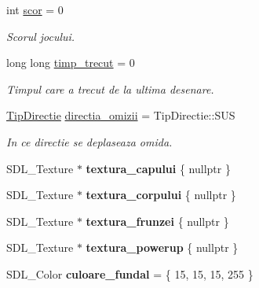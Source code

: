 \begin{DoxyCompactItemize}
int \hyperlink{classStadiulJocului_a1c96d2d1fdcc40bf7c111f549f14ccb5}{scor} = 0
\begin{DoxyCompactList}\small\item\em Scorul jocului. \end{DoxyCompactList}\item 
\mbox{\label{classStadiulJocului_a338b9e5467ad6d4d355c3978e04d32d6}} 
long long \hyperlink{classStadiulJocului_a338b9e5467ad6d4d355c3978e04d32d6}{timp\+\_\+trecut} = 0
\begin{DoxyCompactList}\small\item\em Timpul care a trecut de la ultima \textquotesingle{}desenare\textquotesingle{}. \end{DoxyCompactList}\item 
\hyperlink{main_8cpp_aea66a0d525bf9bfb9b61e9cc1ba0b752}{Tip\+Directie} \hyperlink{classStadiulJocului_a79d2c301f57a7fc525534994ffd7057e}{directia\+\_\+omizii} = Tip\+Directie\+::\+S\+US
\begin{DoxyCompactList}\small\item\em In ce directie se deplaseaza omida. \end{DoxyCompactList}\item 
\mbox{\label{classStadiulJocului_a80f225be50024541c53fe7f3d508571e}} 
S\+D\+L\+\_\+\+Texture $\ast$ {\bfseries textura\+\_\+capului} \{ nullptr \}
\item 
\mbox{\label{classStadiulJocului_a1e7f3685bac572dc18cda0182fd376be}} 
S\+D\+L\+\_\+\+Texture $\ast$ {\bfseries textura\+\_\+corpului} \{ nullptr \}
\item 
\mbox{\label{classStadiulJocului_a468205051b2d772552dcbd85da88194e}} 
S\+D\+L\+\_\+\+Texture $\ast$ {\bfseries textura\+\_\+frunzei} \{ nullptr \}
\item 
\mbox{\label{classStadiulJocului_a2c786c42b52f98153c834751143a03f0}} 
S\+D\+L\+\_\+\+Texture $\ast$ {\bfseries textura\+\_\+powerup} \{ nullptr \}
\item 
\mbox{\label{classStadiulJocului_ab1c4b5d772a958860c7d880605cff1a9}} 
S\+D\+L\+\_\+\+Color {\bfseries culoare\+\_\+fundal} = \{ 15, 15, 15, 255 \}
\end{DoxyCompactItemize}
